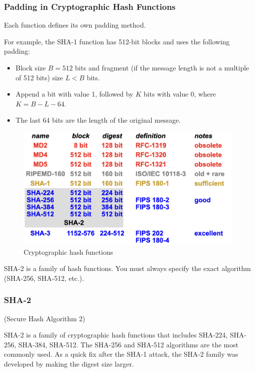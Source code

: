 \subsubsection*{Padding in Cryptographic Hash Functions}
Each function defines its own padding method.

For example, the SHA-1 function has 512-bit blocks and uses the following padding:
\begin{itemize}
    \item Block size $B = 512$ bits and fragment (if the message length is not a multiple of 512 bits) size $L < B$ bits.
    \item Append a bit with value 1, followed by $K$ bits with value 0, where $K = B - L - 64$.
    \item The last 64 bits are the length of the original message.
\end{itemize}

\begin{figure}[H]
    \centering
    \includegraphics[width=0.5\linewidth]{Images/Cryptography/crypto_hash_functions.png}
    \caption{Cryptographic hash functions}
\end{figure}

\begin{tcolorbox}[colback=red!10!white, colframe=red!70!black, coltitle=white, title=Beware]
SHA-2 is a family of hash functions. You must always specify the exact algorithm (SHA-256, SHA-512, etc.).
\end{tcolorbox}

\subsubsection*{SHA-2}
\begin{center}
    (Secure Hash Algorithm 2)
\end{center}
SHA-2 is a family of cryptographic hash functions that includes SHA-224, SHA-256, SHA-384, SHA-512. The SHA-256 and SHA-512 algorithms are the most commonly used. As a quick fix after the SHA-1 attack, the SHA-2 family was developed by making the digest size larger.

